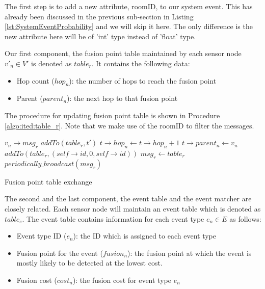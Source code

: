 The first step is to add a new attribute, roomID, to our system event. This has already been discussed in the previous sub-section in Listing \ref{lst:SystemEventProbability} and we will skip it here. The only difference is the new attribute here will be of 'int' type instead of 'float' type.

Our first component, the fusion point table maintained by each sensor node \(v'_n\in V'\) is denoted as \(table_r\). It contains the following data:
\begin{itemize}
\item	Hop count (\(hop_n\)): the number of hops to reach the fusion point
\item	Parent (\(parent_n\)): the next hop to that fusion point
\end{itemize}

The procedure for updating fusion point table is shown in Procedure \ref{algo:ited:table_r}. Note that we make use of the roomID to filter the messages.
\begin{algorithm}
\begin{algorithmic}
\REQUIRE \(v_n\rightarrow msg_r\)
			\STATE \(addTo(table_r, t')\)
		\ENDIF
					\STATE \(t\rightarrow hop_n \gets t\rightarrow hop_n+1\)
					\STATE \(t\rightarrow parent_n \gets v_n\)
				\ENDIF
			\ENDIF
		\ENDFOR
	\ENDFOR
		\STATE \(addTo(table_r, (self\rightarrow id, 0, self\rightarrow id))\)
	\ENDIF
	\STATE \(msg_r \gets table_r\)
	\STATE \(periodically\_broadcast(msg_r)\)
\end{algorithmic}
\caption{Fusion point table exchange}
\label{algo:ited:table_r}
\end{algorithm}

The second and the last component, the event table and the event matcher are closely related. Each sensor node will maintain an event table which is denoted as \(table_e\). The event table contains information for each event type \(e_n\in E\) as follows:
\begin{itemize}
\item Event type ID (\(e_n\)): the ID which is assigned to each event type
\item Fusion point for the event (\(fusion_n\)): the fusion point at which the event is mostly likely to be detected at the lowest cost.
\item Fusion cost (\(cost_n\)): the fusion cost for event type \(e_n\)
\end{itemize}

